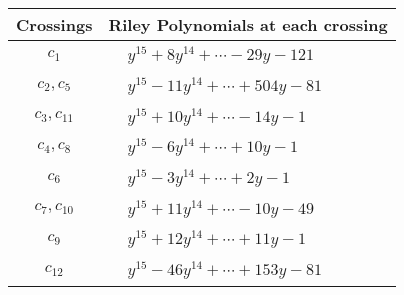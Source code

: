 \documentclass[1p]{elsarticle_modified}
\theoremstyle{definition}
\begin{document}
\begin{tabular}{m{50pt}|m{274pt}}
Crossings & \hspace{64pt}Riley Polynomials at each crossing \\
\hline $$\begin{aligned}c_{1}\end{aligned}$$&$\begin{aligned}
&y^{15}+8 y^{14}+\cdots-29 y-121
\end{aligned}$\\
\hline $$\begin{aligned}c_{2},c_{5}\end{aligned}$$&$\begin{aligned}
&y^{15}-11 y^{14}+\cdots+504 y-81
\end{aligned}$\\
\hline $$\begin{aligned}c_{3},c_{11}\end{aligned}$$&$\begin{aligned}
&y^{15}+10 y^{14}+\cdots-14 y-1
\end{aligned}$\\
\hline $$\begin{aligned}c_{4},c_{8}\end{aligned}$$&$\begin{aligned}
&y^{15}-6 y^{14}+\cdots+10 y-1
\end{aligned}$\\
\hline $$\begin{aligned}c_{6}\end{aligned}$$&$\begin{aligned}
&y^{15}-3 y^{14}+\cdots+2 y-1
\end{aligned}$\\
\hline $$\begin{aligned}c_{7},c_{10}\end{aligned}$$&$\begin{aligned}
&y^{15}+11 y^{14}+\cdots-10 y-49
\end{aligned}$\\
\hline $$\begin{aligned}c_{9}\end{aligned}$$&$\begin{aligned}
&y^{15}+12 y^{14}+\cdots+11 y-1
\end{aligned}$\\
\hline $$\begin{aligned}c_{12}\end{aligned}$$&$\begin{aligned}
&y^{15}-46 y^{14}+\cdots+153 y-81
\end{aligned}$\\
\hline
\end{tabular}\\~\\
\end{document}
